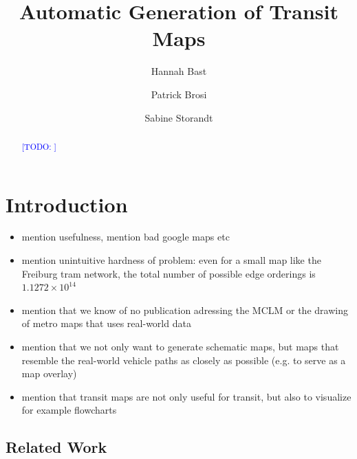 \documentclass{llncs}
\newcommand\todo[1]{\textcolor{blue}{[TODO: #1]}}
\begin{document}
%
\mainmatter
%
\title{Automatic Generation of Transit Maps}
%
%
\author{Hannah Bast \and Patrick Brosi \and
Sabine Storandt}
%
%
%

\maketitle

\begin{abstract}
	\todo{}
\end{abstract}


%
\section{Introduction}\label{SEC:intro}
%

\begin{itemize}
	\item mention usefulness, mention bad google maps etc
	\item mention unintuitive hardness of problem: even for a small map like the Freiburg tram network, the total number of possible edge orderings is $1.1272 \times 10^{14}$
	\item mention that we know of no publication adressing the MCLM or the drawing of metro maps that uses real-world data
	\item mention that we not only want to generate schematic maps, but maps that resemble the real-world vehicle paths as closely as possible (e.g. to serve as a map overlay)
	\item mention that transit maps are not only useful for transit, but also to visualize for example flowcharts
\end{itemize}

%
\subsection{Related Work}\label{SEC:related}
%
\end{document}
